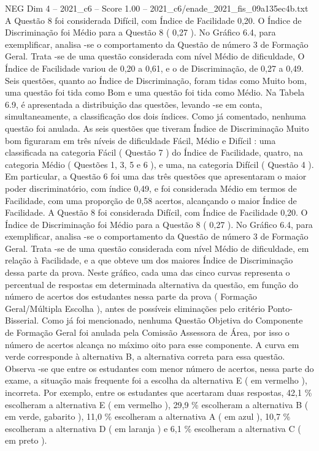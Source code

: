 \begin{textsample}{NEG Dim 4 – 2021\_c6 – Score 1.00 – 2021\_c6/enade\_2021\_fis\_09a135ec4b.txt}
A Questão 8 foi considerada Difícil, com Índice de Facilidade 0,20.
O Índice de Discriminação foi Médio para a Questão 8 ( 0,27 ).
No Gráfico 6.4, para exemplificar, analisa -se o comportamento da Questão de número 3 de Formação Geral.
Trata -se de uma questão considerada com nível Médio de dificuldade, O Índice de Facilidade variou de 0,20 a 0,61, e o de Discriminação, de 0,27 a 0,49.
Seis questões, quanto ao Índice de Discriminação, foram tidas como Muito bom, uma questão foi tida como Bom e uma questão foi tida como Médio.
Na Tabela 6.9, é apresentada a distribuição das questões, levando -se em conta, simultaneamente, a classificação dos dois índices.
Como já comentado, nenhuma questão foi anulada.
As seis questões que tiveram Índice de Discriminação Muito bom figuraram em três níveis de dificuldade Fácil, Médio e Difícil : uma classificada na categoria Fácil ( Questão 7 ) do Índice de Facilidade, quatro, na categoria Médio ( Questões 1, 3, 5 e 6 ), e uma, na categoria Difícil ( Questão 4 ).
Em particular, a Questão 6 foi uma das três questões que apresentaram o maior poder discriminatório, com índice 0,49, e foi considerada Médio em termos de Facilidade, com uma proporção de 0,58 acertos, alcançando o maior Índice de Facilidade.
A Questão 8 foi considerada Difícil, com Índice de Facilidade 0,20.
O Índice de Discriminação foi Médio para a Questão 8 ( 0,27 ).
No Gráfico 6.4, para exemplificar, analisa -se o comportamento da Questão de número 3 de Formação Geral.
Trata -se de uma questão considerada com nível Médio de dificuldade, em relação à Facilidade, e a que obteve um dos maiores Índice de Discriminação dessa parte da prova.
Neste gráfico, cada uma das cinco curvas representa o percentual de respostas em determinada alternativa da questão, em função do número de acertos dos estudantes nessa parte da prova ( Formação Geral/Múltipla Escolha ), antes de possíveis eliminações pelo critério Ponto-Bisserial.
Como já foi mencionado, nenhuma Questão Objetiva do Componente de Formação Geral foi anulada pela Comissão Assessora de Área, por isso o número de acertos alcança no máximo oito para esse componente.
A curva em verde corresponde à alternativa B, a alternativa correta para essa questão.
Observa -se que entre os estudantes com menor número de acertos, nessa parte do exame, a situação mais frequente foi a escolha da alternativa E ( em vermelho ), incorreta.
Por exemplo, entre os estudantes que acertaram duas respostas, 42,1 \% escolheram a alternativa E ( em vermelho ), 29,9 \% escolheram a alternativa B ( em verde, gabarito ), 11,0 \% escolheram a alternativa A ( em azul ), 10,7 \% escolheram a alternativa D ( em laranja ) e 6,1 \% escolheram a alternativa C ( em preto ).

\end{textsample}
